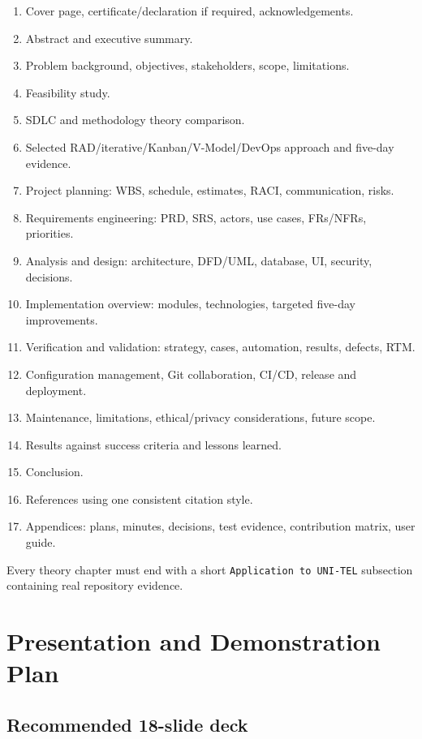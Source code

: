 \documentclass[
  10pt,
  a4paper,
  oneside]{report}
\providecommand{\tightlist}{%
  \setlength{\itemsep}{0pt}\setlength{\parskip}{0pt}}
\begin{document}
\begin{enumerate}
\def\labelenumi{\arabic{enumi}.}
\tightlist
\item
  Cover page, certificate/declaration if required, acknowledgements.
\item
  Abstract and executive summary.
\item
  Problem background, objectives, stakeholders, scope, limitations.
\item
  Feasibility study.
\item
  SDLC and methodology theory comparison.
\item
  Selected RAD/iterative/Kanban/V-Model/DevOps approach and five-day
  evidence.
\item
  Project planning: WBS, schedule, estimates, RACI, communication,
  risks.
\item
  Requirements engineering: PRD, SRS, actors, use cases, FRs/NFRs,
  priorities.
\item
  Analysis and design: architecture, DFD/UML, database, UI, security,
  decisions.
\item
  Implementation overview: modules, technologies, targeted five-day
  improvements.
\item
  Verification and validation: strategy, cases, automation, results,
  defects, RTM.
\item
  Configuration management, Git collaboration, CI/CD, release and
  deployment.
\item
  Maintenance, limitations, ethical/privacy considerations, future
  scope.
\item
  Results against success criteria and lessons learned.
\item
  Conclusion.
\item
  References using one consistent citation style.
\item
  Appendices: plans, minutes, decisions, test evidence, contribution
  matrix, user guide.
\end{enumerate}

Every theory chapter must end with a short
\texttt{Application\ to\ UNI-TEL} subsection containing real repository
evidence.

\chapter{Presentation and Demonstration
Plan}\label{24-presentation-and-demonstration-plan}

\section{Recommended 18-slide deck}\label{241-recommended-18-slide-deck}
\end{document}
